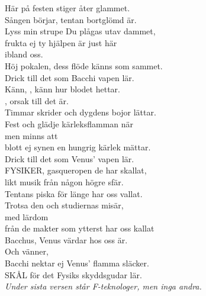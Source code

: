 \documentclass[a6paper, 10pt, twoside]{article}
\begin{document}
\noindent
{}
\small
\begin{center}
\end{center}
\begin{lyrics}
Här på festen stiger åter glammet.\\
Sången börjar, tentan bortglömd är.\\
Lyss min strupe Du plågas utav dammet,\\
frukta ej ty hjälpen är just här\\
ibland oss.\\
Höj pokalen, dess flöde känns som sammet.\\
Drick till det som Bacchi vapen lär.
\vspace{5pt}\\
Känn, , känn hur blodet hettar.\\
, orsak till det är.\\
Timmar skrider och dygdens bojor lättar.\\
Fest och glädje kärleksflamman när\\
men minns att\\
blott ej synen en hungrig kärlek mättar.\\
Drick till det som Venus' vapen lär.
\vspace{5pt}\\
FYSIKER, gasqueropen de har skallat,\\
likt musik från någon högre sfär.\\
Tentans piska för länge har oss vallat.\\
Trotsa den och studiernas misär,\\
med lärdom\\
från de makter som ytterst har oss kallat\\
Bacchus, Venus värdar hos oss är.\\
Och vänner,\\
Bacchi nektar ej Venus' flamma släcker. \\
SKÅL för det Fysiks skyddsgudar lär. 
\vspace{5pt}\\
\textit{Under sista versen står F-teknologer, men inga andra. }\\
\end{lyrics}
\end{document}
